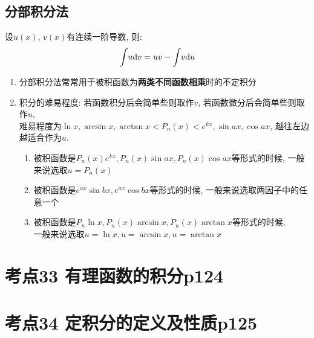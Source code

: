 \subsection{分部积分法}
设$ u(x) $, $ v(x) $有连续一阶导数, 则:
\begin{equation*}
\displaystyle\int_{}\hspace{.2em}u \mathrm{d}v=uv-\displaystyle\int_{}\hspace{.2em}v \mathrm{d}u
\end{equation*}
\begin{tcolorbox}
    \begin{enumerate}

        \item 分部积分法常常用于被积函数为\textbf{两类不同函数相乘}时的不定积分

        \item 积分的难易程度: 若函数积分后会简单些则取作$ v $, 若函数微分后会简单些则取作$ u $, \\难易程度为$ \ln x, \arcsin x, \arctan x<P_{n}(x)<e^{kx}, \sin ax, \cos ax $, 越往左边越适合作为$ u $.

            \begin{enumerate}
                \item 被积函数是$ P_{n}(x)e^{kx}, P_{n}(x)\sin ax, P_{n}(x)\cos ax $等形式的时候, 一般来说选取$ u=P_{n}(x) $
                
                \item 被积函数是$ e^{ax}\sin bx, e^{ax}\cos bx $等形式的时候, 一般来说选取两因子中的任意一个
                
                \item 被积函数是$ P_{n}\ln x, P_{n}(x)\arcsin x, P_{n}(x)\arctan x $等形式的时候,\\ 一般来说选取$ u=\ln x, u=\arcsin x, u=\arctan x $
            
            \end{enumerate}
    \end{enumerate}
\end{tcolorbox}

\section{考点33 有理函数的积分p124}

\section{考点34 定积分的定义及性质p125}

